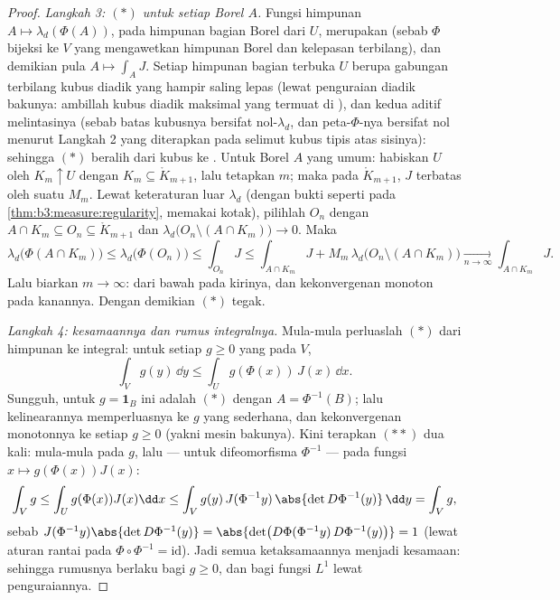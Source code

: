 \begin{proof}
\emph{Langkah 3: $(*)$ untuk setiap Borel $A$.} Fungsi himpunan $A
\mapsto \lambda_d(\Phi(A))$, pada himpunan bagian Borel dari $U$, merupakan
 (sebab $\Phi$ bijeksi ke $V$ yang mengawetkan himpunan Borel
dan kelepasan terbilang), dan demikian pula $A \mapsto \int_AJ$.
Setiap himpunan bagian terbuka $U$ berupa gabungan terbilang
kubus  diadik yang hampir saling lepas (lewat penguraian diadik
bakunya: ambillah kubus diadik maksimal yang termuat di ), dan kedua  aditif melintasinya (sebab batas
kubusnya bersifat nol-$\lambda_d$, dan peta-$\Phi$-nya bersifat
nol menurut Langkah 2 yang diterapkan pada selimut kubus tipis atas sisinya):
sehingga $(*)$ beralih dari kubus ke . Untuk Borel $A$ yang umum:
habiskan $U$ oleh  $K_m \uparrow U$ dengan $K_m \subseteq
\mathring K_{m+1}$, lalu tetapkan $m$; maka pada $\mathring K_{m+1}$, $J$
terbatas oleh suatu $M_m$. Lewat keteraturan luar $\lambda_d$
(dengan bukti seperti pada \cref{thm:b3:measure:regularity}, memakai kotak),
pilihlah  $O_n$ dengan $A \cap K_m \subseteq O_n
\subseteq \mathring K_{m+1}$ dan $\lambda_d\bigl(O_n \setminus
(A\cap K_m)\bigr) \to 0$. Maka
\[
\lambda_d\bigl(\Phi(A\cap K_m)\bigr) \leq
\lambda_d\bigl(\Phi(O_n)\bigr) \leq \int_{O_n}J
\leq \int_{A\cap K_m}J + M_m\,\lambda_d\bigl(O_n\setminus(A\cap
K_m)\bigr) \xrightarrow[n\to\infty]{} \int_{A\cap K_m}J .
\]
Lalu biarkan $m \to \infty$:  dari bawah pada kirinya, dan kekonvergenan monoton
pada kanannya. Dengan demikian $(*)$ tegak.

\emph{Langkah 4: kesamaannya dan rumus integralnya.} Mula-mula
perluaslah $(*)$ dari himpunan ke integral: untuk setiap $g
\geq 0$ yang  pada $V$,
\[
\int_V g(y)\,\dd y \leq \int_U g(\Phi(x))\,J(x)\,\dd x .
\tag{$**$}
\]
Sungguh, untuk $g = \mathbf 1_B$ ini adalah $(*)$ dengan $A =
\Phi^{-1}(B)$; lalu kelinearannya memperluasnya ke $g$ yang sederhana, dan kekonvergenan monotonnya ke
setiap $g \geq 0$ (yakni mesin bakunya). Kini terapkan $(**)$ dua kali:
mula-mula pada $g$, lalu --- untuk difeomorfisma $\Phi^{-1}$ ---
pada fungsi $x \mapsto g(\Phi(x))J(x)$:
\[
\int_Vg \leq \int_U g(\Phi(x))J(x)\dd x
\leq \int_V g(y)\,J(\Phi^{-1}y)\,\abs{\det
D\Phi^{-1}(y)}\,\dd y = \int_V g ,
\]
sebab $J(\Phi^{-1}y)\abs{\det D\Phi^{-1}(y)} = \abs{\det\bigl(
D\Phi(\Phi^{-1}y)\,D\Phi^{-1}(y)\bigr)} = 1$ (lewat aturan rantai pada
$\Phi\circ\Phi^{-1} = \mathrm{id}$). Jadi semua ketaksamaannya menjadi
kesamaan: sehingga rumusnya berlaku bagi $g \geq 0$, dan bagi fungsi
$L^1$ lewat penguraiannya.
\end{proof}

